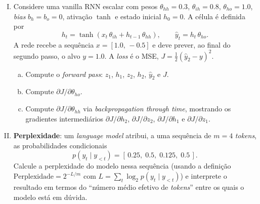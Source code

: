 \documentclass{dlproblemset}
\begin{document}
\begin{enumerate}[I)]
    \item Considere uma vanilla RNN escalar com pesos $\theta_{hh} = 0.3$, $\theta_{ih} = 0.8$, $\theta_{ho} = 1.0$, \textit{bias} $b_h = b_o = 0$, ativação $\tanh$ e estado inicial $h_0 = 0$. A célula é definida por
    \[
        h_t = \tanh(x_t\,\theta_{ih} + h_{t-1}\,\theta_{hh}), \qquad \hat{y}_t = h_t\,\theta_{ho}.
    \]
    A rede recebe a sequência $x = [1.0,\, -0.5]$ e deve prever, ao final do segundo passo, o alvo $y = 1.0$. A \textit{loss} é o MSE, $J = \tfrac{1}{2}(\hat{y}_2 - y)^2$.
    \begin{enumerate}[a)]
        \item Compute o \textit{forward pass}: $z_1$, $h_1$, $z_2$, $h_2$, $\hat{y}_2$ e $J$.
        \item Compute $\partial J / \partial \theta_{ho}$.
        \item Compute $\partial J / \partial \theta_{hh}$ via \textit{backpropagation through time}, mostrando os gradientes intermediários $\partial J / \partial h_2$, $\partial J / \partial z_2$, $\partial J / \partial h_1$ e $\partial J / \partial z_1$.
    \end{enumerate}

    \item \textbf{Perplexidade}: um \textit{language model} atribui, a uma sequência de $m = 4$ \textit{tokens}, as probabilidades condicionais
    \[
        p(y_t \mid y_{<t}) = [\,0.25,\; 0.5,\; 0.125,\; 0.5\,].
    \]
    Calcule a perplexidade do modelo nessa sequência (usando a definição $\text{Perplexidade} = 2^{-L/m}$ com $L = \sum_t \log_2 p(y_t \mid y_{<t})$) e interprete o resultado em termos do ``número médio efetivo de \textit{tokens}'' entre os quais o modelo está em dúvida.


\end{enumerate}
\end{document}

